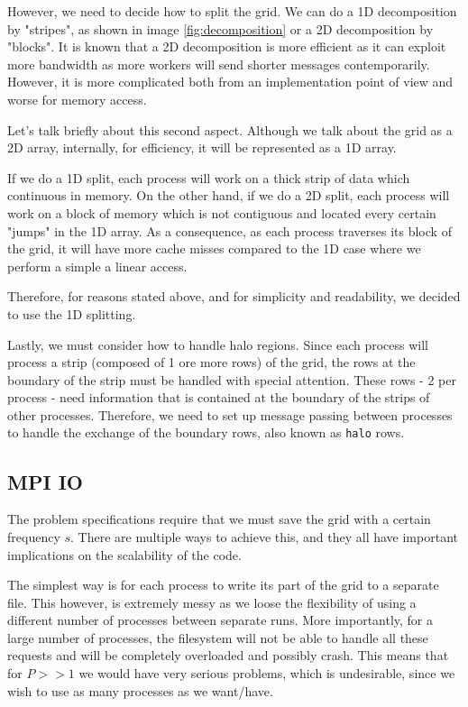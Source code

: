 \documentclass{report}
\begin{document}
However, we need to decide how to split the grid. We can do a 1D decomposition by 
"stripes", as shown in image \ref{fig:decomposition} or a 2D decomposition by 
"blocks". It is known that a 2D decomposition is more efficient as it 
can exploit more bandwidth as more workers will send shorter messages 
contemporarily. However, it is more complicated both from an implementation 
point of view and worse for memory access.

Let's talk briefly about this second aspect. Although we talk about the 
grid as a 2D array, internally, for efficiency, it will be represented as a 1D 
array. 

If we do a 1D split, each process will work on a thick strip of data which 
continuous in memory. On the other hand, if we do a 2D split, each process will 
work on a block of memory which is not contiguous and located every certain 
"jumps" in the 1D array. As a consequence, as each process traverses its block 
of the grid, it will have more cache misses compared to the 1D case where 
we perform a simple a linear access.

Therefore, for reasons stated above, and for simplicity and readability, we 
decided to use the 1D splitting.

Lastly, we must consider how to handle halo regions. Since each process will 
process a strip (composed of 1 ore more rows) of the grid, the rows at the 
boundary of the strip must be handled with special attention. These rows - 2 per 
process - need information that is contained at the boundary of the strips of 
other processes. Therefore, we need to set up message passing between processes 
to handle the exchange of the boundary rows, also known as \texttt{halo} rows.

\subsection{MPI IO}

The problem specifications require that we must save the grid with a certain 
frequency $s$. There are multiple ways to achieve this, and they all have 
important implications on the scalability of the code. 

The simplest way is for each process to write its part of the grid to a 
separate file. This however, is extremely messy as we loose the flexibility 
of using a different number of processes between separate runs. More importantly, 
for a large number of processes, the filesystem will not be able to handle all 
these requests and will be completely overloaded and possibly crash. This means 
that for $P>>1$ we would have very serious problems, which is undesirable, since 
we wish to use as many processes as we want/have.
\end{document}
